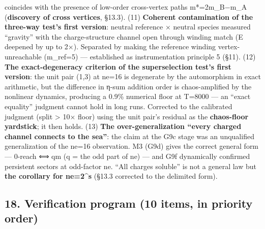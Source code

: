 \documentclass[
]{article}
\begin{document}
\begin{enumerate}
  coincides with the presence of low-order cross-vertex paths
  m*=2m\_B−m\_A (\textbf{discovery of cross vertices}, §13.3). (11)
  \textbf{Coherent contamination of the three-way test's first version}:
  neutral reference × neutral species measured ``gravity'' with the
  charge-structure channel open through winding match (E deepened by up
  to 2×). Separated by making the reference winding vertex-unreachable
  (m\_ref=5) --- established as instrumentation principle 5 (§11). (12)
  \textbf{The exact-degeneracy criterion of the superselection test's
  first version}: the unit pair (1,3) at ne=16 is degenerate by the
  automorphism in exact arithmetic, but the difference in η-sum addition
  order is chaos-amplified by the nonlinear dynamics, producing a 0.9\%
  numerical floor at T=8000 --- an ``exact equality'' judgment cannot
  hold in long runs. Corrected to the calibrated judgment (split
  \textgreater{} 10× floor) using the unit pair's residual as the
  \textbf{chaos-floor yardstick}; it then holds. (13) \textbf{The
  over-generalization ``every charged channel connects to the sea''}:
  the claim at the G9c stage was an unqualified generalization of the
  ne=16 observation. M3 (G9d) gives the correct general form --- 0-reach
  ⟺ q\textbar m (q = the odd part of ne) --- and G9f dynamically
  confirmed persistent sectors at odd-factor ne. ``All charges soluble''
  is not a general law but \textbf{the corollary for ne=2\^{}s} (§13.3
  corrected to the delimited form).
\end{enumerate}

\subsection{18. Verification program (10 items, in priority
order)}\label{verification-program-10-items-in-priority-order}
\end{document}
